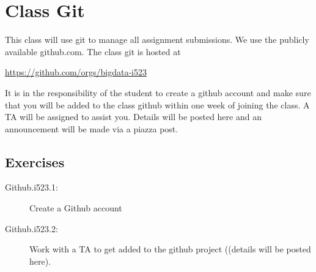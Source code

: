 \FILENAME

\section{Class Git}\label{class-git}

This class will use git to manage all assignment submissions. We use the
publicly available github.com. The class git is hosted at

\url{https://github.com/orgs/bigdata-i523}

It is in the responsibility of the student to create a github account
and make sure that you will be added to the class github within one week
of joining the class. A TA will be assigned to assist you. Details will
be posted here and an announcement will be made via a piazza post.

\subsection{Exercises}

\begin{description}
\item[Github.i523.1:]
Create a Github account
\item[Github.i523.2:]
Work with a TA to get added to the github project ((details will be
posted here).
\end{description}
